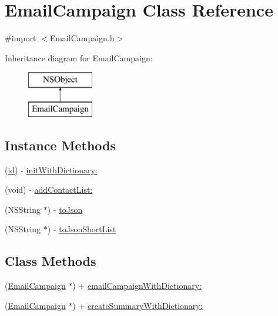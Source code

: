 \hypertarget{interface_email_campaign}{\section{Email\-Campaign Class Reference}
\label{interface_email_campaign}
}


{\ttfamily \#import $<$Email\-Campaign.\-h$>$}

Inheritance diagram for Email\-Campaign\-:\begin{figure}[H]
\begin{center}
\leavevmode
\includegraphics[height=2.000000cm]{interface_email_campaign}
\end{center}
\end{figure}
\subsection*{Instance Methods}
\begin{DoxyCompactItemize}
\item 
(\hyperlink{interface_email_campaign_a53299ba8d3dca7d86269ab1153359c76}{id}) -\/ \hyperlink{interface_email_campaign_acbd2693ea084722489f4d8be87f3e2a1}{init\-With\-Dictionary\-:}
\item 
(void) -\/ \hyperlink{interface_email_campaign_a7766e8c1903c5731e2d6fb577feb6321}{add\-Contact\-List\-:}
\item 
(N\-S\-String $\ast$) -\/ \hyperlink{interface_email_campaign_a80120f561e58f090b0dd070f45317dc0}{to\-Json}
\item 
(N\-S\-String $\ast$) -\/ \hyperlink{interface_email_campaign_a01b717933e1559f9befba7c874b3b574}{to\-Json\-Short\-List}
\end{DoxyCompactItemize}
\subsection*{Class Methods}
\begin{DoxyCompactItemize}
\item 
(\hyperlink{interface_email_campaign}{Email\-Campaign} $\ast$) + \hyperlink{interface_email_campaign_a4c7d6c988d096da421dab0dc3f96ad06}{email\-Campaign\-With\-Dictionary\-:}
\item 
(\hyperlink{interface_email_campaign}{Email\-Campaign} $\ast$) + \hyperlink{interface_email_campaign_a237b49f857f793a00e82ff569e65711f}{create\-Summary\-With\-Dictionary\-:}
\end{DoxyCompactItemize}
